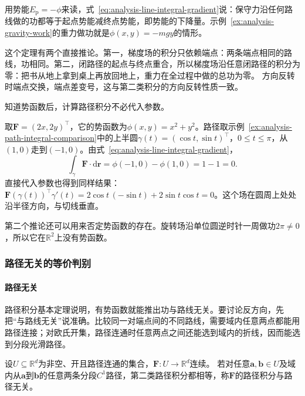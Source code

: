 用势能$E_{\mathrm p}=-\phi$来读，式~\eqref{eq:analysis-line-integral-gradient}说：保守力沿任何路线做的功都等于起点势能减终点势能，即势能的下降量。示例~\ref{ex:analysis-gravity-work}的重力做功就是$\phi(x,y)=-mgy$的情形。

这个定理有两个直接推论。第一，梯度场的积分只依赖端点：两条端点相同的路线，功相同。第二，闭路径的起点与终点重合，所以梯度场沿任意闭路径的积分为零：把书从地上拿到桌上再放回地上，重力在全过程中做的总功为零。
方向反转时端点交换，端点差变号，这与第二类积分的方向反转性质一致。

知道势函数后，计算路径积分不必代入参数。
\begin{example}[用势函数计算沿半圆的积分]
取$\bm F=(2x,2y)^\top$，它的势函数为$\phi(x,y)=x^2+y^2$。路径取示例~\ref{ex:analysis-path-integral-comparison}中的上半圆$\gamma(t)=(\cos t,\sin t)^\top$，$0\leq t\leq\pi$，从$(1,0)$走到$(-1,0)$。由式~\eqref{eq:analysis-line-integral-gradient}，
\[
 \int_\gamma\bm F\cdot\mathrm d\bm r=\phi(-1,0)-\phi(1,0)=1-1=0.
\]
直接代入参数也得到同样结果：$\bm F(\gamma(t))^\top\gamma'(t)=2\cos t\,(-\sin t)+2\sin t\cos t=0$。这个场在圆周上处处沿半径方向，与切线垂直。
\end{example}

第二个推论还可以用来否定势函数的存在。旋转场沿单位圆逆时针一周做功$2\pi\neq0$，所以它在$\mathbb R^2$上没有势函数。

\subsubsection{路径无关的等价判别}

\paragraph{路径无关}

路径积分基本定理说明，有势函数就能推出功与路线无关。要讨论反方向，先把“与路线无关”说准确。比较同一对端点间的不同路线，需要域内任意两点都能用路径连接；对欧氏开集，路径连通时任意两点之间还能选到域内的折线，因而能选到分段光滑路径。
\begin{definition}[路径无关]
设$U\subseteq\mathbb R^d$为非空、开且路径连通的集合，$\bm F:U\to\mathbb R^d$连续。
若对任意$\bm a,\bm b\in U$及域内从$\bm a$到$\bm b$的任意两条分段$C^1$路径，第二类路径积分都相等，称$\bm F$的路径积分与路径无关。
\end{definition}


